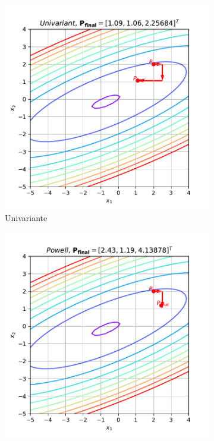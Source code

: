 \documentclass[10pt, a4paper]{article}
\begin{document}
\begin{figure}[htpb]
  \centering
  \begin{subfigure}[b]{0.32\textwidth}
      \centering
      \includegraphics[width=\textwidth]{images/q1_Univariant.pdf}
      \caption{Univariante}
      \label{fig:q1_univariant}
  \end{subfigure}
  \hfill
  \begin{subfigure}[b]{0.32\textwidth}
    \centering
    \includegraphics[width=\textwidth]{images/q1_Powell.pdf}

\end{subfigure}
\end{figure}
\end{document}
